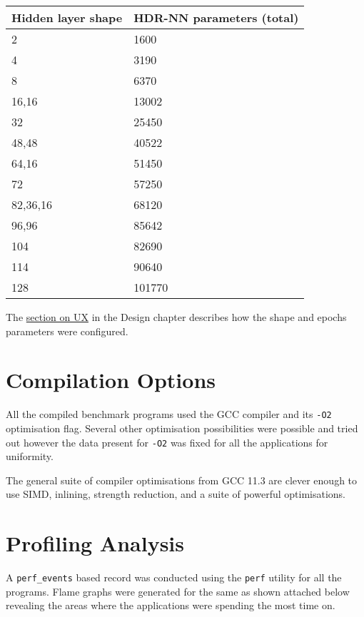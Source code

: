 \begin{table}[ht]
	\centering
	\begin{tabular}{ |p{11em}|p{14em}| }
		\hline
			\textbf{Hidden layer shape} & \textbf{HDR-NN parameters} (total)\\
		\hline
			2 & 1600 \\
		\hline
			4 & 3190 \\
		\hline
			8 & 6370 \\
		\hline
			16,16 & 13002 \\
		\hline
			32 & 25450 \\
		\hline
			48,48 & 40522 \\
		\hline
			64,16 & 51450 \\
		\hline
			72 & 57250 \\
		\hline
			82,36,16 & 68120 \\
		\hline
			96,96 & 85642 \\
		\hline
			104 & 82690 \\
		\hline
			114 & 90640 \\
		\hline
			128 & 101770 \\
		\hline
	\end{tabular}
\end{table}

The \hyperref[section:hdrnn-ux]{section on UX} in the Design chapter describes how the shape and epochs parameters were configured.

\section{Compilation Options}

All the compiled benchmark programs used the GCC compiler and its \texttt{-O2} optimisation flag. Several other optimisation possibilities were possible and tried out however the data present for \texttt{-O2} was fixed for all the applications for uniformity.

The general suite of compiler optimisations from GCC 11.3 are clever enough to use SIMD, inlining, strength reduction, and a suite of powerful optimisations.

\section{Profiling Analysis}

A \texttt{perf\_events} based record was conducted using the \texttt{perf} utility for all the programs. Flame graphs were generated for the same as shown attached below revealing the areas where the applications were spending the most time on.

